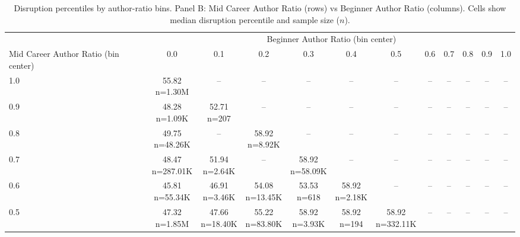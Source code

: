 \begin{table}\centering
            \caption{Disruption percentiles by author-ratio bins. Panel B: Mid Career Author Ratio (rows) vs Beginner Author Ratio (columns). Cells show median disruption percentile and sample size ($n$).}
            \scriptsize
            \setlength\tabcolsep{4pt}
            \renewcommand{\arraystretch}{1.1}
            \begin{tabular}{lccccccccccc}
            \toprule
            & \multicolumn{11}{c}{Beginner Author Ratio (bin center)} \\
            \cmidrule(lr){2-12}
            Mid Career Author Ratio (bin center) & 0.0 & 0.1 & 0.2 & 0.3 & 0.4 & 0.5 & 0.6 & 0.7 & 0.8 & 0.9 & 1.0 \\
            \midrule
            1.0 & \makecell{55.82 \\ \scriptsize n=1.30M} & -- & -- & -- & -- & -- & -- & -- & -- & -- & -- \\
0.9 & \makecell{48.28 \\ \scriptsize n=1.09K} & \makecell{52.71 \\ \scriptsize n=207} & -- & -- & -- & -- & -- & -- & -- & -- & -- \\
0.8 & \makecell{49.75 \\ \scriptsize n=48.26K} & -- & \makecell{58.92 \\ \scriptsize n=8.92K} & -- & -- & -- & -- & -- & -- & -- & -- \\
0.7 & \makecell{48.47 \\ \scriptsize n=287.01K} & \makecell{51.94 \\ \scriptsize n=2.64K} & -- & \makecell{58.92 \\ \scriptsize n=58.09K} & -- & -- & -- & -- & -- & -- & -- \\
0.6 & \makecell{45.81 \\ \scriptsize n=55.34K} & \makecell{46.91 \\ \scriptsize n=3.46K} & \makecell{54.08 \\ \scriptsize n=13.45K} & \makecell{53.53 \\ \scriptsize n=618} & \makecell{58.92 \\ \scriptsize n=2.18K} & -- & -- & -- & -- & -- & -- \\
0.5 & \makecell{47.32 \\ \scriptsize n=1.85M} & \makecell{47.66 \\ \scriptsize n=18.40K} & \makecell{55.22 \\ \scriptsize n=83.80K} & \makecell{58.92 \\ \scriptsize n=3.93K} & \makecell{58.92 \\ \scriptsize n=194} & \makecell{58.92 \\ \scriptsize n=332.11K} & -- & -- & -- & -- & -- \\

\end{tabular}
\end{table}
